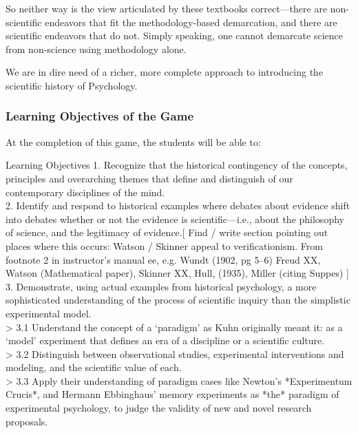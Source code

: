 \begin{refsection}
So neither way is the view articulated by these textbooks correct---there are non-scientific endeavors that fit the methodology-based demarcation, and there are scientific endeavors that do not. Simply speaking, one cannot demarcate science from non-science using methodology alone. 

We are in dire need of a richer, more complete approach to introducing the scientific history of Psychology.

\subsubsection{Learning Objectives of the Game}
\label{learningobjectivesofthegame}

At the completion of this game, the students will be able to:

\begin{apatextbox}{Learning Objectives}
1. Recognize that the historical contingency of the concepts, principles and overarching themes that define and distinguish of our contemporary disciplines of the mind. \\

2. Identify and respond to historical examples where debates about evidence shift into debates whether or not the evidence is scientific---i.e., about the philosophy of science, and the legitimacy of evidence.[ Find / write section pointing out places where this occurs: Watson / Skinner appeal to verificationism. From footnote 2 in instructor’s manual ee, e.g. Wundt (1902, pg 5–6) Freud XX, Watson (Mathematical paper), Skinner XX, Hull, (1935), Miller (citing Suppes) 
]  \\

3. Demonstrate, using actual examples from historical psychology, a more sophisticated understanding of the process of scientific inquiry than the simplistic experimental model. \\

> 3.1 Understand the concept of a ‘paradigm’ as Kuhn originally meant it: as a ‘model’ experiment that defines an era of a discipline or a scientific culture. \\

> 3.2 Distinguish between observational studies, experimental interventions and modeling, and the scientific value of each. \\

> 3.3 Apply their understanding of paradigm cases like Newton’s *Experimentum Crucis*, and Hermann Ebbinghaus’ memory experiments as *the* paradigm of experimental psychology, to judge the validity of new and novel research proposals. \\


\end{apatextbox}
\end{refsection}

